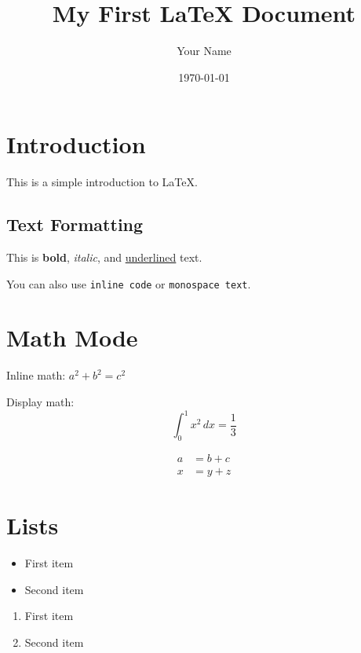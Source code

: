 \documentclass{article} %
\title{My First LaTeX Document} %
\author{Your Name} %
\date{\today} %
\begin{document}

\maketitle %

\section{Introduction} %
This is a simple introduction to \LaTeX. %

\subsection{Text Formatting} %
This is \textbf{bold}, \textit{italic}, and \underline{underlined} text. %

You can also use \verb|inline code| or \texttt{monospace text}. %

\section{Math Mode} %
Inline math: \( a^2 + b^2 = c^2 \) %

Display math:
\[ %
\int_0^1 x^2\,dx = \frac{1}{3} %
\] %

\begin{align} %
  a &= b + c \\ %
  x &= y + z %
\end{align} %

\section{Lists} %
\begin{itemize} %
  \item First item %
  \item Second item %
\end{itemize} %

\begin{enumerate} %
  \item First item %
  \item Second item %
\end{enumerate} %
\end{document}
